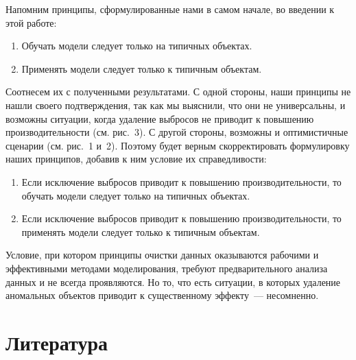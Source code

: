 \documentclass[a4paper,12pt]{article}
\begin{document}
Напомним принципы, сформулированные нами в самом начале, во введении к этой работе:

\medskip\noindent
\begin{enumerate}
	\item Обучать модели следует только на типичных объектах.
	\item Применять модели следует только к типичным объектам.
\end{enumerate}


\medskip\noindent
Соотнесем их с полученными результатами. С одной стороны, наши принципы не нашли своего подтверждения, так как мы выяснили, что они не универсальны, и возможны ситуации, когда удаление выбросов не приводит к повышению производительности (см. рис.~3). С другой стороны, возможны и оптимистичные сценарии (см. рис.~1 и~2). Поэтому будет верным скорректировать формулировку наших принципов, добавив к ним условие их справедливости:

\medskip\noindent
\begin{enumerate}
	\item Если исключение выбросов приводит к повышению производительности, то обучать модели следует только на типичных объектах.
	\item Если исключение выбросов приводит к повышению производительности, то применять модели следует только к типичным объектам.
\end{enumerate}


\medskip\noindent
Условие, при котором принципы очистки данных оказываются рабочими и эффективными методами моделирования, требуют предварительного анализа данных и не всегда проявляются. Но то, что есть ситуации, в которых удаление аномальных объектов приводит к существенному эффекту — несомненно.


\section{Литература}
\end{document}
